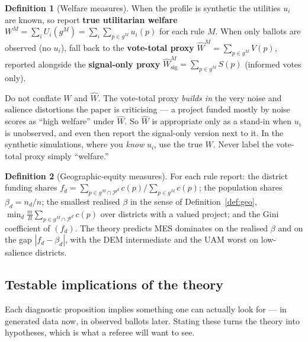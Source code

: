 \documentclass[11pt,letterpaper]{article}
\theoremstyle{definition}
\newtheorem{definition}{Definition}[section]
\theoremstyle{plain}
\theoremstyle{remark}
\newcommand{\Pset}{\mathcal{P}}
\newcommand{\budget}{B}
\newcommand{\cost}{c}
\begin{document}
\begin{definition}[Welfare measures]
\label{def:welfare}
When the profile is synthetic the utilities $u_i$ are known, so report \textbf{true utilitarian
welfare} $W^M=\sum_i U_i(g^M)=\sum_i\sum_{p\in g^M}u_i(p)$ for each rule $M$. When only ballots are
observed (no $u_i$), fall back to the \textbf{vote-total proxy}
$\widehat W^{M}=\sum_{p\in g^M}V(p)$, reported alongside the \textbf{signal-only proxy}
$\widehat W^{M}_{\text{sig}}=\sum_{p\in g^M}S(p)$ (informed votes only).
\end{definition}

\begin{watchout}
Do not conflate $W$ and $\widehat W$. The vote-total proxy \emph{builds in} the very noise and
salience distortions the paper is criticising --- a project funded mostly by noise scores as ``high
welfare'' under $\widehat W$. So $\widehat W$ is appropriate only as a stand-in when $u_i$ is
unobserved, and even then report the signal-only version next to it. In the synthetic simulations,
where you \emph{know} $u_i$, use the true $W$. Never label the vote-total proxy simply ``welfare.''
\end{watchout}

\begin{definition}[Geographic-equity measures]
\label{def:equity-metrics}
For each rule report: the district funding shares
$f_d=\sum_{p\in g^M\cap\Pset^d}\cost(p)\big/\sum_{p\in g^M}\cost(p)$; the population shares
$\beta_d=n_d/n$; the smallest realised $\beta$ in the sense of Definition~\ref{def:geo},
$\min_d \tfrac{m}{\budget}\sum_{p\in g^M\cap\Pset^d}\cost(p)$ over districts with a valued project;
and the Gini coefficient of $(f_d)$. The theory predicts MES dominates on the realised $\beta$ and
on the gap $|f_d-\beta_d|$, with the DEM intermediate and the UAM worst on low-salience districts.
\end{definition}

\subsection{Testable implications of the theory}

Each diagnostic proposition implies something one can actually look for --- in generated data now, in
observed ballots later. Stating these turns the theory into hypotheses, which is what a referee will
want to see.
\end{document}
